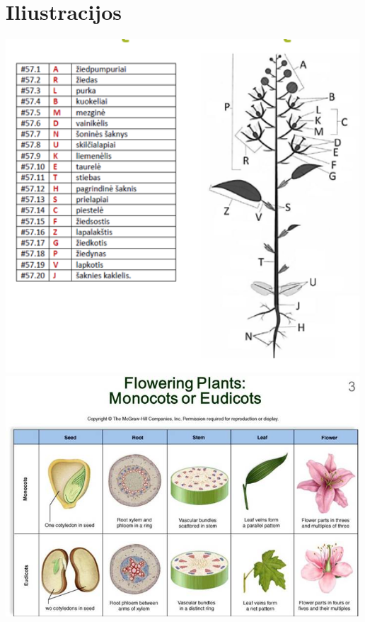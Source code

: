 \documentclass[]{book}
\begin{document}
\hypertarget{iliustracijos}{%
\section{Iliustracijos}\label{iliustracijos}}

\includegraphics[width=500px]{static/augalai/augalo_dalys}
\includegraphics[width=500px]{static/augalai/dvi_vienskilciai}
\end{document}
